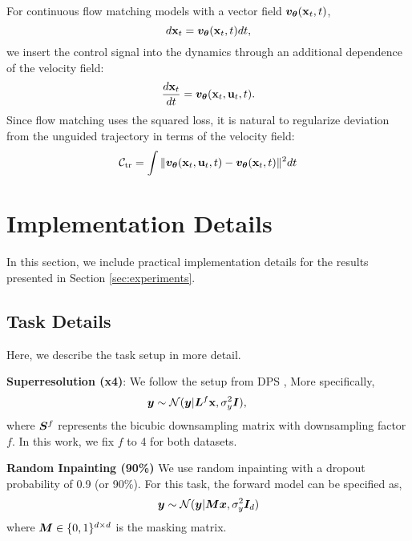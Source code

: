 For continuous flow matching models \citep{lipman2023flow, albergo2023building, liu2023flow} with a vector field ${\bm{v}}_{\bm{\theta}}({\mathbf{x}}_t, t)$, 
\begin{equation}
    d{\mathbf{x}}_t = {\bm{v}}_{\bm{\theta}}({\mathbf{x}}_t, t) dt,
\end{equation}
we insert the control signal into the dynamics through an additional dependence of the velocity field:
\begin{equation}
    \frac{d{\mathbf{x}}_t}{dt} = {\bm{v}}_{\bm{\theta}}({\mathbf{x}}_t, {\mathbf{u}}_t, t).
\end{equation}
Since flow matching uses the squared loss, it is natural to regularize deviation from the unguided trajectory in terms of the velocity field:
\begin{equation}
    {\mathcal{C}}_\text{tr} = \int \| {\bm{v}}_{\bm{\theta}}({\mathbf{x}}_t, {\mathbf{u}}_t, t) - {\bm{v}}_{\bm{\theta}}({\mathbf{x}}_t, t) \|^2 dt
    \label{eq:flow_control_cost}
\end{equation}




\section{Implementation Details}
\label{app:implm}
In this section, we include practical implementation details for the results presented in Section \ref{sec:experiments}.

\subsection{Task Details}
Here, we describe the task setup in more detail.

\textbf{Superresolution (x4)}: We follow the setup from DPS \citep{chung2022diffusion}, More specifically,
\begin{align}
    {\bm{y}} \sim {\mathcal{N}}({\bm{y}}| {\bm{L}}^{f}{\mathbf{x}}, \sigma_y^2 {\bm{I}}),\qquad
\end{align}
where ${\bm{S}}^{f}$ represents the bicubic downsampling matrix with downsampling factor $f$. In this work, we fix $f$ to 4 for both datasets.

\textbf{Random Inpainting (90\%)}
We use random inpainting with a dropout probability of 0.9 (or 90\%). For this task, the forward model can be specified as,
\begin{align}
    {\bm{y}} \sim {\mathcal{N}}({\bm{y}}| {\bm{M}}{\bm{x}}, \sigma_y^2 {\bm{I}}_d)
\end{align}
where ${\bm{M}} \in \{0, 1\}^{d \times d}$ is the masking matrix.

